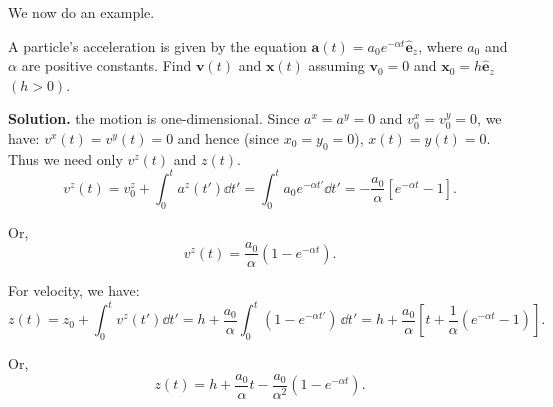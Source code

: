 \documentclass[10pt]{article}
\begin{document}
	We now do an example. 
	\begin{exercise}
		A particle's acceleration is given by the equation $\mathbf{a}(t) = a_0 e^{-\alpha t} \hat{\mathbf{e}}_z$, where $a_0$ and $\alpha$ are positive constants. Find $\mathbf{v}(t)$ and $\mathbf{x}(t)$ assuming $\mathbf{v}_{0} = 0$ and $\mathbf{x}_{0} = h \hat{\mathbf{e}}_z$ $(h>0)$. 

		\vspace{1\baselineskip}
		\textbf{Solution.} the motion is one-dimensional. Since $a^{x} = a^{y} = 0$ and $v_0^{x} = v_0^{y} = 0$, we have: $v^{x}(t) = v^{y}(t) = 0$ and hence (since $x_0 = y_0 = 0$), $x(t) = y(t) = 0$. Thus we need only $v^{z}(t)$ and $z(t)$. 
		\begin{equation}
		  v^{z}(t) = v_0^{z} + \int_{0}^{t}a^{z}(t')\dd t' = \int_{0}^{t} a_0e^{-\alpha t'} \dd t' = -\frac{a_0}{\alpha} \left[ e^{-\alpha t} - 1 \right].
		\end{equation}

		Or,
		\begin{equation}
		  v^{z}(t) = \frac{a_0}{\alpha} \left( 1-e^{-\alpha t} \right). 
		\end{equation}

		For velocity, we have:
		\begin{equation}
		  z(t) = z_0 + \int_{0}^{t} v^{z}(t')\dd t' = h + \frac{a_0}{\alpha} \int_{0}^{t} \left( 1-e^{-\alpha t'} \right) \,\dd t' = h + \frac{a_0}{\alpha} \left[ t + \frac{1}{\alpha} \left( e^{-\alpha t}-1 \right)  \right].
		\end{equation}

		Or,
		\begin{equation}
		  z(t) = h + \frac{a_0}{\alpha}t - \frac{a_0}{\alpha ^{2}} \left( 1-e^{-\alpha t} \right).
		\end{equation}
	\end{exercise}
\end{document}
